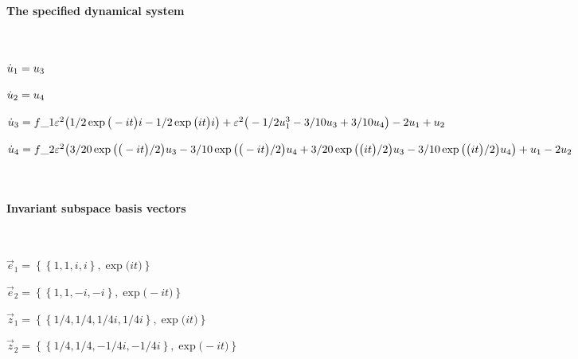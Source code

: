 
\(\)
\paragraph{The specified dynamical system}
\(
\)\par

\(\dot u_{1}=u\sb3
\)\par

\(\dot u_{2}=u\sb4
\)\par

\(\dot u_{3}=f\_1 \varepsilon^{2} \big(1/2 \exp \big(-i t\big) i-1/2 \exp \big(i 
t\big) i\big)+\varepsilon^{2} \big(-1/2 u\sb1^{3}-3/10 u\sb3+3/10 u\sb4\big)-2 
u\sb1+u\sb2
\)\par

\(\dot u_{4}=f\_2 \varepsilon^{2} \big(3/20 \exp \big(\big(-i t\big)/2\big) u\sb3
-3/10 \exp \big(\big(-i t\big)/2\big) u\sb4+3/20 \exp \big(\big(i t\big)
/2\big) u\sb3-3/10 \exp \big(\big(i t\big)/2\big) u\sb4\big)+u\sb1-2 
u\sb2
\)\par

\(\)
\paragraph{Invariant subspace basis vectors}
\(
\)\par

\(\vec e_{1}=\left\{
\left\{
1 , 1 , i , i
\right\} , \exp \big(i t\big)
\right\}
\)\par

\(\vec e_{2}=\left\{
\left\{
1 , 1 , -i , -i
\right\} , \exp \big(-i t\big)
\right\}
\)\par

\(\vec z_{1}=\left\{
\left\{
1/4 , 1/4 , 1/4 i , 1/4 i
\right\} , \exp \big(i t\big)
\right\}
\)\par

\(\vec z_{2}=\left\{
\left\{
1/4 , 1/4 , -1/4 i , -1/4 i
\right\} , \exp \big(-i t\big)
\right\}
\)\par
